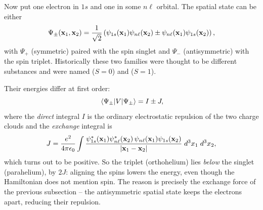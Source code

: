 \documentclass[a4paper]{scrartcl}
\begin{document}
\begin{example}
    Now put one electron in $1s$ and one in some $n\ell$ orbital. The spatial state can be either
    $$
    \Psi_\pm(\mathbf{x}_1,\mathbf{x}_2) = \frac{1}{\sqrt2}\left( \psi_{1s}(\mathbf{x}_1)\psi_{n\ell}(\mathbf{x}_2) \pm \psi_{n\ell}(\mathbf{x}_1)\psi_{1s}(\mathbf{x}_2) \right),
    $$
    with $\Psi_+$ (symmetric) paired with the spin singlet and $\Psi_-$ (antisymmetric) with the spin triplet. Historically these two families were thought to be different substances and were named  ($S = 0$) and  ($S=1$).

    Their energies differ at first order:
    $$
    \mel{\Psi_\pm}{V}{\Psi_\pm} = I \pm J,
    $$
    where the \emph{direct} integral $I$ is the ordinary electrostatic repulsion of the two charge clouds and the \emph{exchange} integral is
    $$
    J = \frac{e^2}{4\pi\epsilon_0}\int \frac{\psi_{1s}^*(\mathbf{x}_1)\psi_{n\ell}^*(\mathbf{x}_2)\,\psi_{n\ell}(\mathbf{x}_1)\psi_{1s}(\mathbf{x}_2)}{\lvert\mathbf{x}_1 - \mathbf{x}_2\rvert}\; d^3x_1 \; d^3x_2,
    $$
    which turns out to be positive. So the triplet (orthohelium) lies \emph{below} the singlet (parahelium), by $2J$: aligning the spins lowers the energy, even though the Hamiltonian does not mention spin. The reason is precisely the exchange force of the previous subsection -- the antisymmetric spatial state keeps the electrons apart, reducing their repulsion.
\end{example}

\begin{center}
\end{center}
\end{document}
